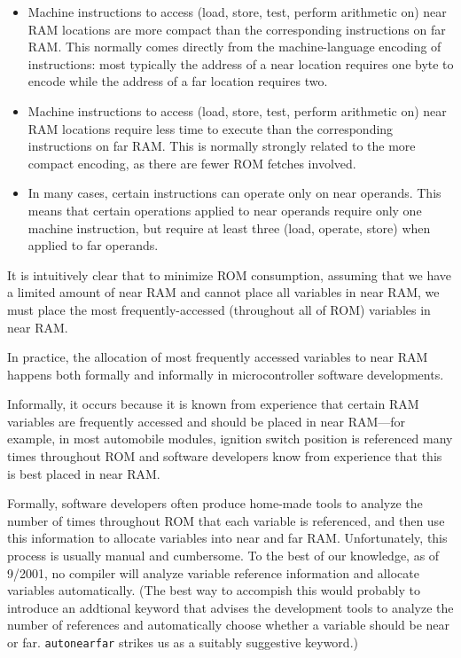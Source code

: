 \begin{itemize}
\item Machine instructions to access (load, store, test, perform
      arithmetic on) near RAM locations are more compact than the
      corresponding instructions on far RAM.  This normally comes
      directly from the machine-language encoding of instructions:
      most typically the address of a near location requires one byte
      to encode while the address of a far location requires two.
\item Machine instructions to access (load, store, test, perform
      arithmetic on) near RAM locations require less time to
      execute than the
      corresponding instructions on far RAM.  This is normally
      strongly related to the more compact encoding, as there
      are fewer ROM fetches involved.
\item In many cases, certain instructions can operate only on near
      operands.  This means that certain operations applied to
      near operands require only one machine instruction,
      but require at least three (load, operate, store) when 
      applied to far operands.
\end{itemize}

It is intuitively clear that to minimize ROM consumption, assuming that
we have a limited amount of near RAM and cannot place all variables
in near RAM, we must place the most frequently-accessed (throughout
all of ROM) variables in near RAM.

In practice, the allocation of most frequently accessed variables to 
near RAM happens both formally and informally in microcontroller 
software developments.  

Informally, it occurs because it is known
from experience that certain RAM variables are frequently accessed
and should be placed in near RAM---for example, in most automobile
modules, ignition switch position is referenced many times throughout
ROM and software developers know from experience that this is best placed
in near RAM. 

Formally, software developers often produce home-made tools to analyze
the number of times throughout ROM that each variable is referenced, and then
use this information to allocate variables into near and far RAM.
Unfortunately, this process is usually manual and cumbersome.
To the best of our knowledge, as of 9/2001, no compiler will analyze
variable reference information and allocate variables automatically.
(The best way to accompish this would probably to introduce an
addtional keyword that advises the development tools to analyze
the number of references and automatically choose whether a variable should be 
near or far.  \texttt{autonearfar} strikes us as a suitably
suggestive keyword.)


